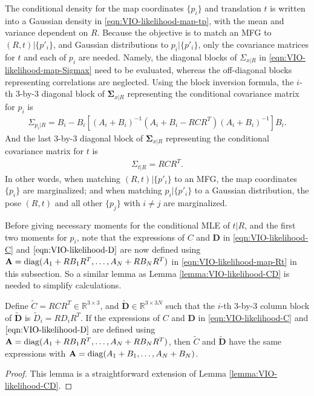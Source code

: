 The conditional density for the map coordinates $\{p_i\}$ and translation $t$ is written into a Gaussian density in \eqref{eqn:VIO-likelihood-map-tp}, with the mean and variance dependent on $R$.
Because the objective is to match an MFG to $(R,t)|\{p'_i\}$, and Gaussian distributions to $p_i|\{p'_i\}$, only the covariance matrices for $t$ and each of $p_i$ are needed.
Namely, the diagonal blocks of $\Sigma_{x|R}$ in \eqref{eqn:VIO-likelihood-map-Sigmax} need to be evaluated, whereas the off-diagonal blocks representing correlations are neglected.
Using the block inversion formula, the $i$-th 3-by-3 diagonal block of $\bm{\Sigma}_{x|R}$ representing the conditional covariance matrix for $p_i$ is
\begin{align}
	\Sigma_{p_i|R} = B_i - B_i \left[ (A_i+B_i)^{-1} (A_i+B_i - RCR^T) (A_i+B_i)^{-1} \right] B_i.
\end{align}
And the last 3-by-3 diagonal block of $\bm{\Sigma}_{x|R}$ representing the conditional covariance matrix for $t$ is
\begin{align}
	\Sigma_{t|R} = RCR^T.
\end{align}
In other words, when matching $(R,t)|\{p'_i\}$ to an MFG, the map coordinates $\{p_i\}$ are marginalized; and when matching $p_i|\{p'_i\}$ to a Gaussian distribution, the pose $(R,t)$ and all other $\{p_j\}$ with $i\neq j$ are marginalized.

Before giving necessary moments for the conditional MLE of $t|R$, and the first two moments for $p_i$, note that the expressions of $C$ and $\mathbf{D}$ in \eqref{eqn:VIO-likelihood-C} and $\eqref{eqn:VIO-likelihood-D}$ are now defined using $\mathbf{A} = \mathrm{diag}(A_1+RB_1R^T, \ldots, A_N+RB_NR^T)$ in \eqref{eqn:VIO-likelihood-map-Rt} in this subsection.
So a similar lemma as Lemma \ref{lemma:VIO-likelihood-CD} is needed to simplify calculations.

\begin{lemma}
	Define $\tilde{C} = RCR^T \in \mathbb{R}^{3\times 3}$, and $\tilde{\mathbf{D}} \in \mathbb{R}^{3\times 3N}$ such that the $i$-th 3-by-3 column block of $\tilde{\mathbf{D}}$ is $\tilde{D}_i = RD_iR^T$.
	If the expressions of $C$ and $\mathbf{D}$ in \eqref{eqn:VIO-likelihood-C} and $\eqref{eqn:VIO-likelihood-D}$ are defined using $\mathbf{A} = \mathrm{diag}(A_1+RB_1R^T, \ldots, A_N+RB_NR^T)$, then $\tilde{C}$ and $\tilde{\mathbf{D}}$ have the same expressions with $\mathbf{A} = \mathrm{diag}(A_1+B_1,\ldots,A_N+B_N)$.
\end{lemma}
\begin{proof}
	This lemma is a straightforward extension of Lemma \ref{lemma:VIO-likelihood-CD}.
\end{proof}

